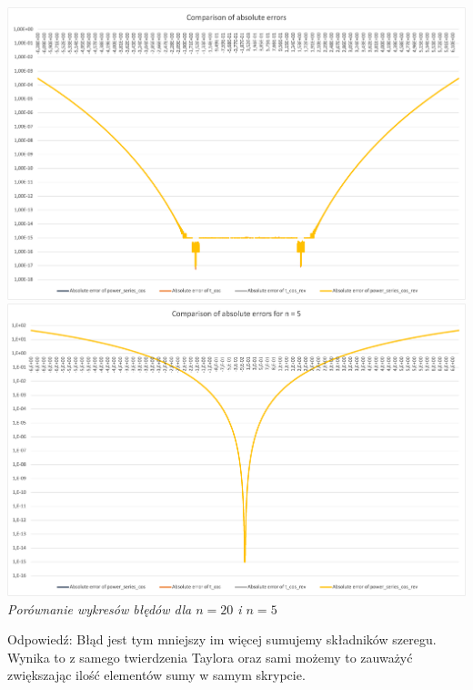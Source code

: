 \documentclass{article}
\begin{document}
\begin{center}
    \includegraphics[scale=0.45]{comparison.png}
    \includegraphics[scale=0.45]{comparison-n5.png} \\
    \textit{Porównanie wykresów błędów dla $n = 20$ i $n = 5$}
\end{center}

Odpowiedź: Błąd jest tym mniejszy im więcej sumujemy składników szeregu. Wynika to z samego twierdzenia Taylora oraz sami możemy to zauważyć zwiększając ilość elementów sumy w samym skrypcie.
\end{document}
